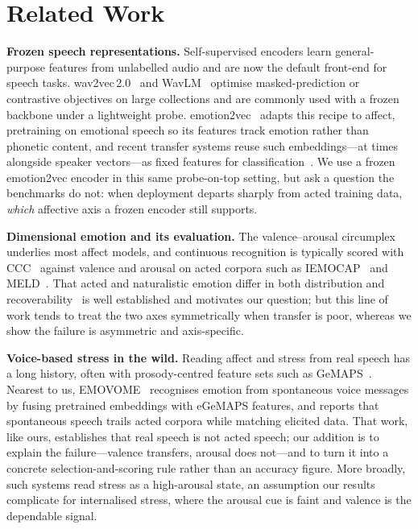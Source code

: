 \documentclass[conference]{IEEEtran}
\begin{document}
\section{Related Work}

\textbf{Frozen speech representations.} Self-supervised encoders learn
general-purpose features from unlabelled audio and are now the default front-end
for speech tasks. wav2vec\,2.0~\cite{wav2vec2} and WavLM~\cite{wavlm} optimise
masked-prediction or contrastive objectives on large collections and are commonly
used with a frozen backbone under a lightweight probe. emotion2vec~\cite{emotion2vec}
adapts this recipe to affect, pretraining on emotional speech so its features
track emotion rather than phonetic content, and recent transfer systems reuse such
embeddings---at times alongside speaker vectors---as fixed features for
classification~\cite{jakubec2024}. We use a frozen emotion2vec encoder in this same
probe-on-top setting, but ask a question the benchmarks do not: when deployment
departs sharply from acted training data, \emph{which} affective axis a frozen
encoder still supports.

\textbf{Dimensional emotion and its evaluation.} The valence--arousal
circumplex~\cite{russell1980} underlies most affect models, and continuous
recognition is typically scored with CCC~\cite{lin1989ccc} against valence and
arousal on acted corpora such as IEMOCAP~\cite{iemocap} and MELD~\cite{meld}. That
acted and naturalistic emotion differ in both distribution and
recoverability~\cite{douglascowie2003} is well established and motivates our
question; but this line of work tends to treat the two axes symmetrically when
transfer is poor, whereas we show the failure is asymmetric and axis-specific.

\textbf{Voice-based stress in the wild.} Reading affect and stress from real speech
has a long history, often with prosody-centred feature sets such as
GeMAPS~\cite{gemaps}. Nearest to us, EMOVOME~\cite{emovome} recognises emotion from
spontaneous voice messages by fusing pretrained embeddings with eGeMAPS features,
and reports that spontaneous speech trails acted corpora while matching elicited
data. That work, like ours, establishes that real speech is not acted speech; our
addition is to explain the failure---valence transfers, arousal does not---and to
turn it into a concrete selection-and-scoring rule rather than an accuracy figure.
More broadly, such systems read stress as a high-arousal state, an assumption our
results complicate for internalised stress, where the arousal cue is faint and
valence is the dependable signal.
\end{document}
